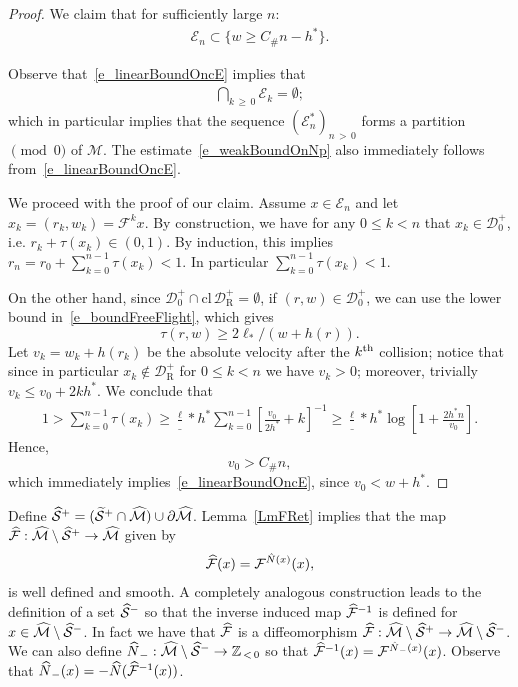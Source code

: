 \documentclass[10pt]{amsart}
\theoremstyle{definition}\newtheorem{defi}[theo]{Definition}\newtheorem{rema}[theo]{Remark}\newtheorem{exam}[theo]{Example}\newtheorem{exem}[theo]{Example}\newtheorem{nota}[theo]{Notation}
\newcommand{\nin}{\not\in}
\newcommand{\ct}{r}
\newcommand{\fft}{\tau}
\newcommand{\cl}[1]{\mathrm{cl}\,#1}
\newcommand{\inv}{^{-1}}
\newcommand{\bZ}{\mathbb{Z}}
\newcommand{\cE}{\mathcal E}
\newcommand{\cEs}{\mathcal E^{*}}
\newcommand{\cm}{\mathcal{F}}
\newcommand{\cell}{\mathcal{D}}
\newcommand{\csp}{\mathcal{M}}
\newcommand{\cmp}{\hat\cm}
\newcommand{\cspi}{\widehat{\csp}}
\newcommand{\privateu}[1]{#1^*}
\newcommand{\privatel}[1]{#1_*}
\newcommand{\slope}{h}
\newcommand{\slopeu}{\privateu{\slope}}
\newcommand{\elll}{\privatel{\ell}}
\newcommand{\recoPrivate}{\mathrm{R}}
\newcommand{\backReco}{{\cell^+_{\recoPrivate}}}
\newcommand{\singPrivate}{\mathcal{S}}
\newcommand{\singp}[1]{\hat{\singPrivate}^{#1}}
\newcommand{\singt}[1]{\tilde{\singPrivate}^{#1}}
\newcommand{\Np}{\hat N}
\newcommand{\Const}{C_\#}
\let\oldtilde\tilde
\renewcommand*{\tilde}[1]{\mathchoice{\widetilde{#1}}{\widetilde{#1}}{\oldtilde{#1}}{\oldtilde{#1}}}
\let\oldhat\hat
\renewcommand*{\hat}[1]{\mathchoice{\widehat{#1}}{\widehat{#1}}{\oldhat{#1}}{\oldhat{#1}}}
\begin{document}
\begin{proof}
We claim that for sufficiently large $n$:
\begin{align}\label{e_linearBoundOncE}
\cE_n \subset \{w\ge \Const n-\slopeu\}.
\end{align}

Observe that~\eqref{e_linearBoundOncE} implies that
\begin{align*}
\bigcap_{k\,\ge\,0}\cE_k = \emptyset;
\end{align*}
which in particular implies that the sequence $(\cEs_n)_{n\,>\,0}$ forms a partition$\pmod 0$ of $\csp$. The estimate~\eqref{e_weakBoundOnNp} also immediately follows from~\eqref{e_linearBoundOncE}.

We proceed with the proof of our claim. Assume $x\in\cE_n$ and let $x_k =(r_k,w_k) = \cm^k x$. By construction, we have for any $0\le k < n$ that $x_k\in\cell^+_0$, i.e. $\ct_{k}+\fft(x_{k}) \in(0,1)$. By induction, this implies $\ct_n = \ct_{0}+\sum_{k=0}^{n-1}\fft(x_k) < 1$. In particular
$\sum_{k=0}^{n-1}\fft(x_k) < 1. $

On the other hand, since $\cell^+_0\cap\cl\backReco = \emptyset$, if $(r,w)\in\cell^+_0$, we can use the lower bound in~\eqref{e_boundFreeFlight}, which gives
\begin{equation}\label{FTRecall}
\fft(\ct,w)\geq2\elll/(w+h(\ct)).
\end{equation}
Let $v_k = w_k+h(\ct_{k})$ be the absolute velocity after the $k^{\rm th}$ collision; notice that since in particular $x_k\nin\backReco$ for $0\le k < n$ we have $v_k > 0$; moreover, trivially $v_k \le v_0+2k\slopeu$. We conclude that
\begin{align*}
1 > \sum_{k = 0}^{n-1}\fft(x_k)\ge \frac\elll\slopeu\sum_{k = 0}^{n-1}\left[\frac{v_0}{2\slopeu}+k\right]\inv\ge\frac\elll\slopeu\log\left[1+\frac{2\slopeu n}{v_0}\right].
\end{align*}
Hence,
\begin{equation}\label{ColBLV}
v_0 > \Const n,
\end{equation}
which immediately implies~\eqref{e_linearBoundOncE}, since $v_0 < w+\slopeu$.
\end{proof}

Define $\singp+ = (\singt+\cap\cspi) \cup \partial\cspi$. Lemma~\ref{LmFRet} implies that the map $\cmp:\cspi\setminus\singp+\to\cspi$ given by
\begin{align*}
\cmp(x) = \cm^{\Np(x)}(x),
\end{align*}
is well defined and smooth. A completely analogous construction leads to the definition of a set $\singp{-}$ so that the inverse induced map $\cmp\inv$ is defined for $x\in\cspi\setminus\singp-$. In fact we have that $\cmp$ is a diffeomorphism $\cmp:\cspi\setminus\singp+\to\cspi\setminus\singp-$. We can also define $\Np_{-}:\cspi\setminus\singp-\to\bZ_{\,<\,0}$ so that $\cmp\inv(x) = \cm^{\Np_{-}(x)}(x)$. Observe that $\Np_{-}(x) =-\Np(\cmp\inv(x))$.
\end{document}
